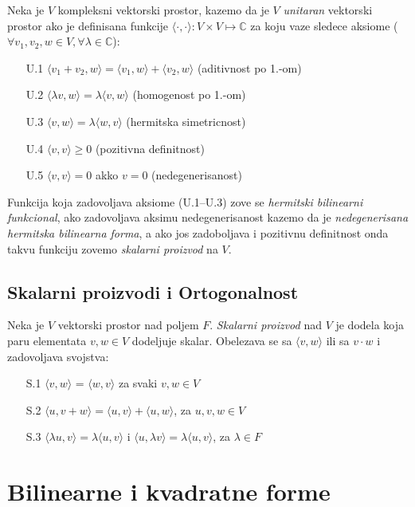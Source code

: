 \documentclass[12p,a4paper]{article}
\begin{document}
\begin{multicols}{2}
    Neka je $V$ kompleksni vektorski prostor, kazemo da je $V$ 
    \textit{unitaran} vektorski prostor ako je definisana funkcije 
    $\langle \cdot, \cdot \rangle : V \times V \mapsto \mathbb{C}$ 
    za koju vaze sledece aksiome 
    ($\forall v_1, v_2, w \in V, \forall \lambda \in \mathbb{C}$):
    \begin{enumerate}
        \itemsep0em
        \item [U.1] $\langle v_1 + v_2, w \rangle = 
            \langle v_1, w \rangle + \langle v_2, w \rangle$ 
            (aditivnost po 1.-om)
        \item [U.2] $\langle \lambda v, w \rangle = 
            \lambda \langle v, w \rangle$ (homogenost po 1.-om)
        \item [U.3] $\langle v, w \rangle = \lambda \langle w, v \rangle$ 
            (hermitska simetricnost)
        \item [U.4] $\langle v, v \rangle \geq 0$ (pozitivna definitnost)
        \item [U.5] $\langle v, v \rangle = 0$ akko $v = 0$ (nedegenerisanost)
    \end{enumerate}

    Funkcija koja zadovoljava aksiome (U.1--U.3) zove se 
    \textit{hermitski bilinearni funkcional}, ako zadovoljava aksimu 
    nedegenerisanost kazemo da je 
    \textit{nedegenerisana hermitska bilinearna forma}, a ako jos zadoboljava 
    i pozitivnu definitnost onda takvu funkciju zovemo 
    \textit{skalarni proizvod} na $V$.

\subsection{Skalarni proizvodi i Ortogonalnost}

    Neka je $V$ vektorski prostor nad poljem $F$. \textit{Skalarni proizvod}  
    nad $V$ je dodela koja paru elementata $v, w \in V$ dodeljuje skalar.
    Obelezava se sa $\langle v, w \rangle$ ili sa $v \cdot w$ i zadovoljava 
    svojstva:
    \begin{enumerate}
        \itemsep0em
        \item [S.1] $\langle v, w \rangle$ = $\langle w, v \rangle$ za svaki 
            $v, w \in V$
        \item [S.2] $\langle u, v + w \rangle = 
            \langle u, v \rangle + \langle u, w \rangle$, za $u,v,w \in V$
        \item [S.3] $\langle \lambda u, v \rangle = 
            \lambda \langle u, v \rangle$ 
            i $\langle u, \lambda v \rangle = \lambda \langle u, v \rangle$, 
            za $\lambda \in F$
    \end{enumerate}

\section{Bilinearne i kvadratne forme}
 
\end{multicols}
\end{document}
